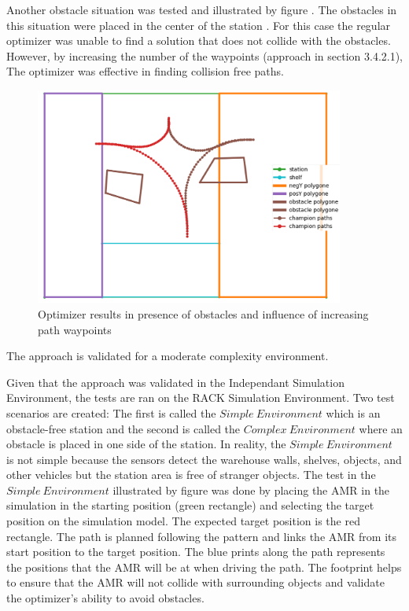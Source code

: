 Another obstacle situation was tested and illustrated by figure .
The obstacles in this situation were placed in the center of the station . 
For this case the regular optimizer was unable to find a solution that does not collide 
with the obstacles. However, by increasing the number of the waypoints (approach in section 3.4.2.1),
The optimizer was effective in finding collision free paths. 


\begin{figure}[H]
    \begin{center}
        \includegraphics[width=4in]{images/Chap3/Figure_6.png} %
        \caption{Optimizer results in presence of obstacles and influence of increasing path waypoints}
        \label{OptResult3}
        \end{center}    
\end{figure}

The approach is validated for a moderate complexity environment.

Given that the approach was validated in the Independant Simulation Environment, the tests are 
ran on the RACK Simulation Environment. Two test scenarios are created: 
The first is called the \(Simple~Environment\) which is an obstacle-free station and the second is
called the \(Complex~Environment\) where an obstacle is placed in one side of the station. 
In reality, the \(Simple~Environment\) is not simple because the sensors detect the warehouse walls,
shelves, objects, and other vehicles but the station area is free of stranger objects.
The test in the \(Simple~Environment\) illustrated by figure  was done by placing the 
AMR in the simulation in the starting position (green rectangle) and selecting the target position on 
the simulation model. The expected target position is the red rectangle. 
The path is planned following the pattern and links the AMR from its start position to the target position.
The blue prints along the path represents the positions that the AMR will be at when driving the path.
The footprint helps to ensure that the AMR will not collide with surrounding objects and 
validate the optimizer's ability to avoid obstacles. 

